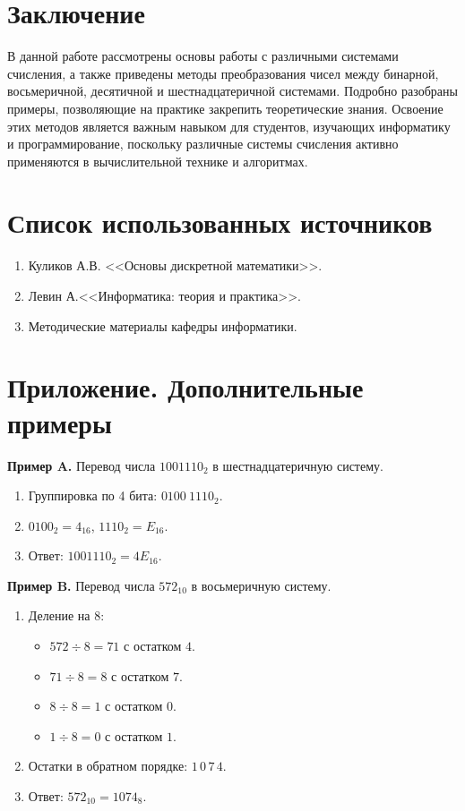 \documentclass[12pt,a4paper]{article}
\begin{document}
\section{Заключение}
В данной работе рассмотрены основы работы с различными системами счисления, а также приведены методы преобразования чисел между бинарной, восьмеричной, десятичной и шестнадцатеричной системами. Подробно разобраны примеры, позволяющие на практике закрепить теоретические знания. Освоение этих методов является важным навыком для студентов, изучающих информатику и программирование, поскольку различные системы счисления активно применяются в вычислительной технике и алгоритмах.

\section*{Список использованных источников}
\begin{enumerate}
    \item Куликов А.В. <<Основы дискретной математики>>.
    \item Левин А.<<Информатика: теория и практика>>.
    \item Методические материалы кафедры информатики.
\end{enumerate}

\section*{Приложение. Дополнительные примеры}

\textbf{Пример A.} Перевод числа \(1001110_2\) в шестнадцатеричную систему.
\begin{enumerate}
    \item Группировка по 4 бита: \(0100\ 1110_2\).
    \item \(0100_2 = 4_{16}\), \(1110_2 = E_{16}\).
    \item Ответ: \(1001110_2 = 4E_{16}\).
\end{enumerate}

\textbf{Пример B.} Перевод числа \(572_{10}\) в восьмеричную систему.
\begin{enumerate}
    \item Деление на 8:
    \begin{itemize}
        \item \(572 \div 8 = 71\) с остатком \(4\).
        \item \(71 \div 8 = 8\) с остатком \(7\).
        \item \(8 \div 8 = 1\) с остатком \(0\).
        \item \(1 \div 8 = 0\) с остатком \(1\).
    \end{itemize}
    \item Остатки в обратном порядке: \(1\,0\,7\,4\).
    \item Ответ: \(572_{10} = 1074_8\).
\end{enumerate}
\end{document}
